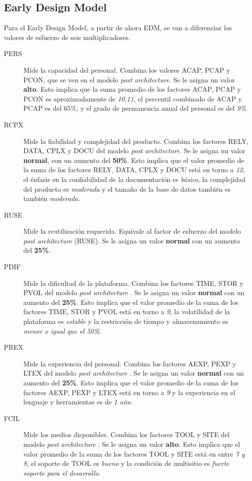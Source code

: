 \documentclass[11pt,a4paper,spanish,twoside]{book}
\begin{document}
\subsection{Early Design Model}
Para el Early Design Model, a partir de ahora EDM, se van a diferenciar los
valores de esfuerzo de seis multiplicadores.

\begin{description}
\item[PERS] Mide la capacidad del personal. Combina los valores ACAP, PCAP y
PCON, que se ven en el modelo \emph{post architecture}. Se le asigna un
valor \textbf{alto}. Esto implica que la suma promedio de los factores
ACAP, PCAP y PCON es aproximadamente de \emph{10,11}, el percentil combinado
de ACAP y PCAP es del 65\%; y el grado de permanencia anual del personal es
del \emph{9\%}.

\item[RCPX] Mide la fiabilidad y complejidad del producto. Combina los
factores RELY, DATA, CPLX y DOCU del modelo \emph{post architecture}. Se le
asigna un valor \textbf{normal}, con un aumento del \textbf{50\%}. Esto
implica que el valor promedio de la suma de los factores RELY, DATA, CPLX y
DOCU está en torno a \emph{12}, el énfasis en la confiabilidad de la
documentación es \emph{básico}, la complejidad del producto es
\emph{moderada} y el tamaño de la base de datos también es también
\emph{moderada}.

\item[RUSE] Mide la reutilización requerida. Equivale al factor de esfuerzo
del modelo \emph{post architecture} (RUSE). Se le asigna un valor
\textbf{normal} con un aumento del \textbf{25\%}.

\item[PDIF] Mide la dificultad de la plataforma. Combina los factores TIME, 
STOR y PVOL del modelo \emph{post architecture} . Se le asigna un valor
\textbf{normal} con un aumento del \textbf{25\%}. Esto implica que el valor 
promedio de la suma de los factores TIME, STOR y PVOL está en torno a \emph{9},
la volatilidad de la plataforma es \emph{estable} y la restricción de tiempo y
almacenamiento es \emph{menor o igual que el 50\%}.

\item[PREX] Mide la experiencia del personal. Combina los factores AEXP, PEXP y
LTEX del modelo \emph{post architecture} . Se le asigna un valor 
\textbf{normal} con un aumento del \textbf{25\%}. Esto implica que el valor 
promedio de la suma de los factores AEXP, PEXP y LTEX está en torno a \emph{9}
y la experiencia en el lenguaje y herramientas es de \emph{1 año}.

\item[FCIL] Mide los medios disponibles. Combina los factores TOOL y SITE del 
modelo \emph{post architecture} . Se le asigna un valor \textbf{alto}. Esto 
implica que el valor promedio de la suma de los factores TOOL y SITE está en 
entre \emph{7 y 8}, el soporte de TOOL es \emph{bueno} y la condición de 
multisitio es \emph{fuerte soporte para el desarrollo}.

\end{description}
\end{document}
